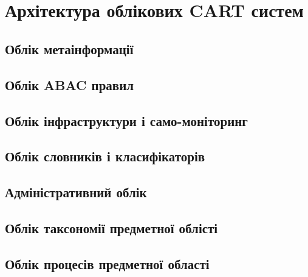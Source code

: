 \\
\\
\newpage
\section{Архітектура облікових CART систем}

\subsection{Облік метаінформації}

\subsection{Облік ABAC правил}

\subsection{Облік інфраструктури і само-моніторинг}

\subsection{Облік словників і класифікаторів}

\subsection{Адміністративний облік}

\subsection{Облік таксономії предметної облісті}

\subsection{Облік процесів предметної області}

